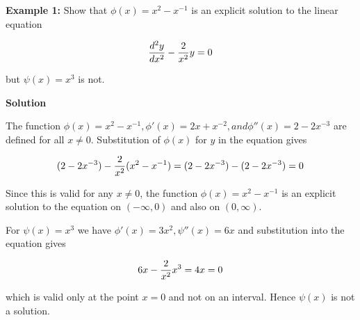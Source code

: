 \nopagenumbers
{\bf Example 1:} Show that $\phi(x)=x^2-x^{-1}$ is an explicit solution to the linear equation

$${d^2y\over dx^2}-{2\over x^2}y=0$$

but $\psi(x)=x^3$ is not.

\vskip 10pt
{\bf Solution}

\vskip 6pt
The function $\phi(x)=x^2-x^{-1},\phi'(x)=2x+x^{-2},and \phi''(x)=2-2x^{-3}$ are defined for all $x\neq 0$. Substitution of $\phi(x)$ for $y$ in the equation gives

$$(2-2x^{-3})-{2\over x^2}(x^2-x^{-1})=(2-2x^{-3})-(2-2x^{-3})=0$$

Since this is valid for any $x\neq 0$, the function $\phi(x)=x^2-x^{-1}$ is an explicit solution to the equation on $(-\infty,0)$ and also on $(0,\infty)$.

\vskip 1mm
For $\psi(x)=x^3$ we have $\phi'(x)=3x^2,\psi''(x)=6x$ and substitution into the equation gives

$$6x-{2\over x^2}x^3=4x=0$$

which is valid only at the point $x=0$ and not on an interval. Hence $\psi(x)$ is not a solution.

\vfill\eject
\bye
